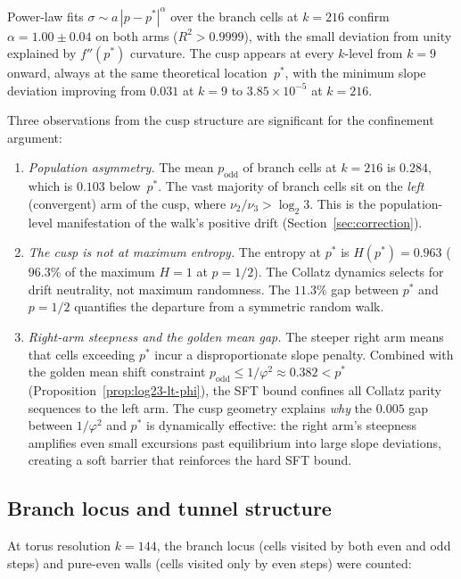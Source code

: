 \documentclass[manuscript]{aomart}
\theoremstyle{plain}
\theoremstyle{definition}
\theoremstyle{remark}
\numberwithin{equation}{section}
\begin{document}
Power-law fits $\sigma \sim a\,|p - p^*|^\alpha$ over the branch
cells at $k = 216$ confirm $\alpha = 1.00 \pm 0.04$ on both arms
($R^2 > 0.9999$), with the small deviation from unity explained by
$f''(p^*)$ curvature.  The cusp appears at every $k$-level from
$k = 9$ onward, always at the same theoretical location~$p^*$, with
the minimum slope deviation improving from $0.031$ at $k = 9$ to
$3.85 \times 10^{-5}$ at $k = 216$.

Three observations from the cusp structure are significant for the
confinement argument:

\begin{enumerate}
\item \emph{Population asymmetry.}  The mean $p_{\mathrm{odd}}$ of
  branch cells at $k = 216$ is $0.284$, which is $0.103$ below~$p^*$.
  The vast majority of branch cells sit on the \emph{left}
  (convergent) arm of the cusp, where $\nu_2/\nu_3 > \log_2 3$.
  This is the population-level manifestation of the walk's positive
  drift (Section~\ref{sec:correction}).

\item \emph{The cusp is not at maximum entropy.}  The entropy at
  $p^*$ is $H(p^*) = 0.963$ ($96.3\%$ of the maximum $H = 1$ at
  $p = 1/2$).  The Collatz dynamics selects for drift neutrality,
  not maximum randomness.  The $11.3\%$ gap between $p^*$ and
  $p = 1/2$ quantifies the departure from a symmetric random walk.

\item \emph{Right-arm steepness and the golden mean gap.}  The
  steeper right arm means that cells exceeding $p^*$ incur a
  disproportionate slope penalty.  Combined with the golden mean
  shift constraint $p_{\mathrm{odd}} \le 1/\varphi^2 \approx 0.382
  < p^*$ (Proposition~\ref{prop:log23-lt-phi}), the SFT bound
  confines all Collatz parity sequences to the left arm.  The cusp
  geometry explains \emph{why} the $0.005$ gap between $1/\varphi^2$
  and $p^*$ is dynamically effective: the right arm's steepness
  amplifies even small excursions past equilibrium into large slope
  deviations, creating a soft barrier that reinforces the hard SFT
  bound.
\end{enumerate}

\subsection{Branch locus and tunnel structure}

At torus resolution $k = 144$, the branch locus (cells visited by
both even and odd steps) and pure-even walls (cells visited only by
even steps) were counted:
\end{document}
